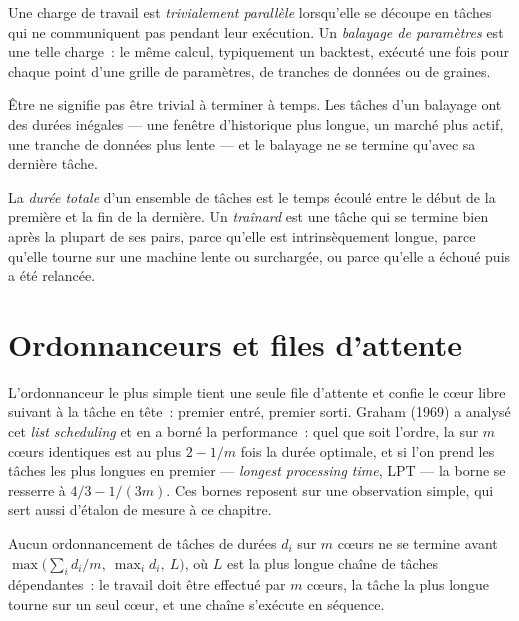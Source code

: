 \begin{definition}\label{def:pl:distributed-compute-and-schedulers:sweep}
Une charge de travail est \emph{trivialement parallèle} lorsqu'elle se découpe en tâches qui ne communiquent pas
pendant leur exécution. Un \emph{balayage de paramètres} est une telle charge~: le même calcul, typiquement un backtest, exécuté une fois
pour chaque point d'une grille de paramètres, de tranches de données ou de graines.
\end{definition}

Être  ne signifie pas être trivial à terminer à temps. Les tâches d'un balayage ont des durées inégales --- une fenêtre d'historique plus longue, un marché plus actif,
une tranche de données plus lente --- et le balayage ne se termine qu'avec sa dernière tâche.

\begin{definition}\label{def:pl:distributed-compute-and-schedulers:makespan}
La \emph{durée totale} d'un ensemble de tâches est le temps écoulé entre le début de la première et la fin de la dernière. Un
\emph{traînard} est une tâche qui se termine bien après la plupart de ses pairs, parce qu'elle est intrinsèquement longue, parce qu'elle tourne
sur une machine lente ou surchargée, ou parce qu'elle a échoué puis a été relancée.
\end{definition}

\section{Ordonnanceurs et files d'attente}

L'ordonnanceur le plus simple tient une seule file d'attente et confie le cœur libre suivant à la tâche en tête~: premier entré, premier sorti. Graham (1969) a analysé cet
\emph{list scheduling} et en a borné la performance~: quel que soit l'ordre, la  sur $m$ cœurs identiques est au plus $2 - 1/m$ fois la durée optimale,
et si l'on prend les tâches les plus longues en premier --- \emph{longest processing time}, LPT --- la borne se resserre à $4/3 - 1/(3m)$. Ces bornes reposent sur une
observation simple, qui sert aussi d'étalon de mesure à ce chapitre.

\begin{proposition}\label{prop:pl:distributed-compute-and-schedulers:bound}
Aucun ordonnancement de tâches de durées $d_i$ sur $m$ cœurs ne se termine avant $\max\bigl(\sum_i d_i / m,\ \max_i d_i,\ L\bigr)$, où $L$ est la
plus longue chaîne de tâches dépendantes~: le travail doit être effectué par $m$ cœurs, la tâche la plus longue tourne sur un seul cœur, et une chaîne s'exécute en séquence.
\end{proposition}

